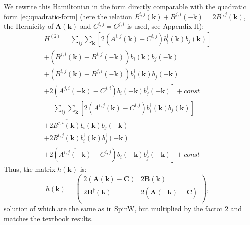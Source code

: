 \documentclass[a4paper,12pt]{article}
\begin{document}
            We rewrite this Hamiltonian in the form directly comparable with the quadratic form \eqref{eq:quadratic-form} 
            (here the relation $B^{i,j}(\boldsymbol{k}) + B^{j,i}(-\boldsymbol{k}) = 2B^{i,j}(\boldsymbol{k})$, 
            the Hermicity of $\boldsymbol{A}(\boldsymbol{k})$ and $C^{i,j} = C^{j,i}$ is used, see Appendix II):
            \begin{multline}
                H^{(2)} = \sum_{ij}\sum_{\boldsymbol{k}}\left[2(A^{i,j}(\boldsymbol{k}) - C^{i,j})b^{\dag}_{i}(\boldsymbol{k})b_{j}(\boldsymbol{k})\right] \\
                +(\overline{B^{j,i}(\boldsymbol{k})} + \overline{B^{i,j}(-\boldsymbol{k})})b_i(\boldsymbol{k})b_{j}(-\boldsymbol{k}) \\
                +(B^{i,j}(\boldsymbol{k}) + B^{j,i}(-\boldsymbol{k}))b^{\dag}_{i}(\boldsymbol{k})b^{\dag}_{j}(-\boldsymbol{k})\\
                +\left.2(A^{j,i}(-\boldsymbol{k}) - C^{j,i})b_{i}(-\boldsymbol{k})b^{\dag}_{j}(-\boldsymbol{k})\right] + const\\
                = \sum_{ij}\sum_{\boldsymbol{k}}\left[2(A^{i,j}(\boldsymbol{k}) - C^{i,j})b^{\dag}_{i}(\boldsymbol{k})b_{j}(\boldsymbol{k})\right] \\
                +2\overline{B^{j,i}(\boldsymbol{k})}b_i(\boldsymbol{k})b_{j}(-\boldsymbol{k}) \\
                +2B^{i,j}(\boldsymbol{k})b^{\dag}_{i}(\boldsymbol{k})b^{\dag}_{j}(-\boldsymbol{k})\\
                +\left.2(\overline{A^{i,j}(-\boldsymbol{k})} - C^{i,j})b_{i}(-\boldsymbol{k})b^{\dag}_{j}(-\boldsymbol{k})\right] + const
            \end{multline}
            Thus, the matrix $h(\boldsymbol{k})$ is:
            \begin{equation}
                h(\boldsymbol{k}) = 
                \begin{pmatrix}
                    2(\boldsymbol{A}(\boldsymbol{k}) - \boldsymbol{C}) & 2\boldsymbol{B}(\boldsymbol{k}) \\
                    2\boldsymbol{B}^{\dag}(\boldsymbol{k}) & 2(\overline{\boldsymbol{A}(-\boldsymbol{k})} - \boldsymbol{C}) \\
                \end{pmatrix},\label{eq:matrix-colpa}
            \end{equation}
            solution of which are the same as in SpinW, but multiplied by the factor $2$ and matches the textbook results.
\end{document}
